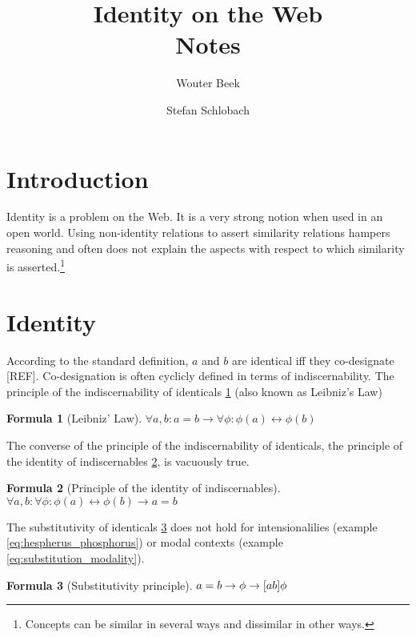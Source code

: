 \documentclass[11pt,a4paper,notitlepage,onecolumn,twoside]{article}
\title{Identity on the Web \\ Notes}
\author{Wouter Beek \and Stefan Schlobach}
\newtheorem{formula}{Formula}
\begin{document}
\maketitle

\section{Introduction}

Identity is a problem on the Web. It is a very strong notion when used in an
open world. Using non-identity relations to assert similarity relations
hampers reasoning and often does not explain the aspects with respect to
which similarity is asserted.\footnote{Concepts can be similar in several
ways and dissimilar in other ways.}

\section{Identity}

According to the standard definition, $a$ and $b$ are identical
iff they co-designate [REF]. Co-designation is often cyclicly defined
in terms of indiscernability. The principle of the indiscernability of
identicals \ref{eq:leibniz_law} (also known as Leibniz's Law) 

\begin{formula}[Leibniz' Law]
\label{eq:leibniz_law}
$\forall a,b: a = b \rightarrow \forall \phi: \phi(a) \leftrightarrow \phi(b)$
\end{formula}

The converse of the principle of the indiscernability of identicals,
the principle of the identity of indiscernables
\ref{eq:principle_of_the_identity_of_indiscernables}, is vacuously true.

\begin{formula}[Principle of the identity of indiscernables]
\label{eq:principle_of_the_identity_of_indiscernables}
$\forall a,b: \forall \phi: \phi(a) \leftrightarrow \phi(b) \rightarrow a = b$
\end{formula}

The substitutivity of identicals \ref{eq:substitutivity_principle}
does not hold for intensionalilies (example \ref{eq:hespherus_phosphorus})
or modal contexts (example \ref{eq:substitution_modality}).

\begin{formula}[Substitutivity principle]
\label{eq:substitutivity_principle}
$a = b \rightarrow \phi \rightarrow [a \\ b]\phi$
\end{formula}
\end{document}
